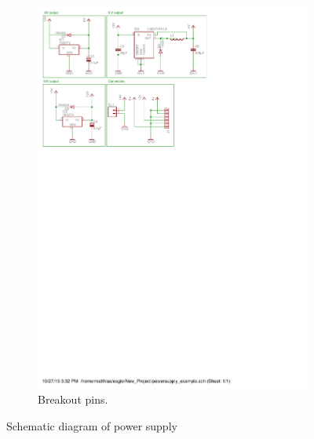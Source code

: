 \begin{figure}[H]
\begin{subfigure}{0.4\linewidth}
\includegraphics[scale=0.8,trim={5.3cm 18.5cm 10.4cm 6.0cm},clip]{img/powersupply.pdf}
\caption{Breakout pins.}
\label{fig::sch_power_pins}
\end{subfigure}
\caption{Schematic diagram of power supply}
\label{fig::sch_power}
\end{figure}

